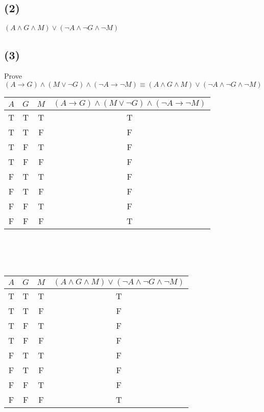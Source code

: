 \documentclass{article}
\begin{document}
\subsection*{(2)}
$(A \land G \land M) \lor (\neg A \land \neg G \land \neg M)$
\subsection*{(3)}
Prove $(A \rightarrow G) \land (M \lor \neg G) \land (\neg A \rightarrow \neg M) \equiv (A \land G \land M) \lor (\neg A \land \neg G \land \neg M)$
\begin{tabular}{| c | c | c || c |}
    \hline
    $A$ & $G$ & $M$ & $(A \rightarrow G) \land (M \lor \neg G) \land (\neg A \rightarrow \neg M)$ \\ \hline \hline
    T & T & T & T \\ \hline
    T & T & F & F \\ \hline
    T & F & T & F \\ \hline
    T & F & F & F \\ \hline
    F & T & T & F \\ \hline
    F & T & F & F \\ \hline
    F & F & T & F \\ \hline
    F & F & F & T \\ \hline
\end{tabular}
\\ \\ \\
\begin{tabular}{| c | c | c || c |}
    \hline
    $A$ & $G$ & $M$ & $(A \land G \land M) \lor (\neg A \land \neg G \land \neg M)$ \\ \hline \hline
    T & T & T & T \\ \hline
    T & T & F & F \\ \hline
    T & F & T & F \\ \hline
    T & F & F & F \\ \hline
    F & T & T & F \\ \hline
    F & T & F & F \\ \hline
    F & F & T & F \\ \hline
    F & F & F & T \\ \hline
\end{tabular}
\clearpage
\end{document}
